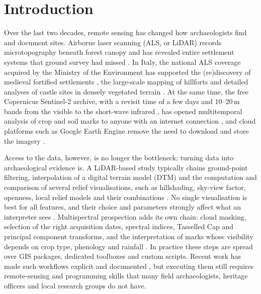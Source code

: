 \documentclass[preprint,12pt,authoryear]{elsarticle}
\begin{document}
\section{Introduction}
\label{sec:intro}

Over the last two decades, remote sensing has changed how archaeologists find and document sites. Airborne laser scanning (ALS, or LiDAR) records microtopography beneath forest canopy and has revealed entire settlement systems that ground survey had missed \citep{devereux2005woodland,chase2012geospatial,vinci2024review}. In Italy, the national ALS coverage acquired by the Ministry of the Environment has supported the (re)discovery of medieval fortified settlements \citep{lasaponara2009fullwave,masini2018canopy}, the large-scale mapping of hillforts \citep{fontana2022hillforts} and detailed analyses of castle sites in densely vegetated terrain \citep{corbo2024land,corbo2025groma}. At the same time, the free Copernicus Sentinel-2 archive, with a revisit time of a few days and 10--20\,m bands from the visible to the short-wave infrared \citep{drusch2012sentinel2}, has opened multitemporal analysis of crop and soil marks to anyone with an internet connection \citep{agapiou2014sentinel,tapete2018sentinel,abate2020sentinel}, and cloud platforms such as Google Earth Engine remove the need to download and store the imagery \citep{gorelick2017gee}.

Access to the data, however, is no longer the bottleneck; turning data into archaeological evidence is. A LiDAR-based study typically chains ground-point filtering, interpolation of a digital terrain model (DTM) and the computation and comparison of several relief visualisations, such as hillshading, sky-view factor, openness, local relief models and their combinations \citep{zaksek2011svf,doneus2013openness,hesse2010lrm,kokalj2019single}. No single visualisation is best for all features, and their choice and parameters strongly affect what an interpreter sees \citep{bennett2012comparison,stular2012visualization,kokalj2017guide}. Multispectral prospection adds its own chain: cloud masking, selection of the right acquisition dates, spectral indices, Tasselled Cap and principal component transforms, and the interpretation of marks whose visibility depends on crop type, phenology and rainfall \citep{kauth1976tasseled,agapiou2013window,masini2018cropmarks,kalayci2019contrast,abate2020sentinel}. In practice these steps are spread over GIS packages, dedicated toolboxes \citep{kokalj2016rvt,challis2011toolkit} and custom scripts. Recent work has made such workflows explicit and documented \citep{lozic2021workflow,corbo2024land}, but executing them still requires remote-sensing and programming skills that many field archaeologists, heritage officers and local research groups do not have.
\end{document}
